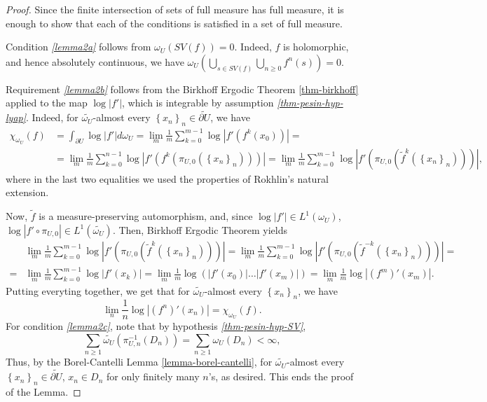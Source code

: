 \documentclass[11pt]{article}
\theoremstyle{definition}
\theoremstyle{remark}
\theoremstyle{plain}
\begin{document}
\begin{proof} Since the finite intersection of sets of full measure has full measure, it is enough to show that each of the conditions is satisfied in a set of full measure.
	
Condition {\em\ref{lemma2a}} follows from $ \omega_U(SV(f))=0$. Indeed, $ f $ is holomorphic, and hence absolutely continuous, we have $\omega_U( \bigcup_{s\in SV(f)} \bigcup_{n\geq0}f^n(s)) =0 $.


Requirement {\em\ref{lemma2b}} follows from the Birkhoff Ergodic Theorem \ref{thm-birkhoff} applied to the map $ \log \left| f'\right| $, which is integrable by assumption {\em \ref{thm-pesin-hyp-lyap}}. Indeed, for $ \widetilde{\omega_U }$-almost every $ \left\lbrace x_n\right\rbrace  _n\in\widetilde{\partial U} $, we have
\begin{align*}
	\chi_{\omega_U} (f)&=\int_{\partial U} \log \left| f'\right| d\omega_U=\lim\limits_{m}\frac{1}{m}\sum_{k=0}^{m-1}\log \left| f'(f^k(x_0))\right|=
	\\
&=	\lim\limits_{m}\frac{1}{m}\sum_{k=0}^{n-1}\log \left| f'(f^k(\pi_{U, 0}(\left\lbrace x_n\right\rbrace _n)))\right| =\lim\limits_{m}\frac{1}{m}\sum_{k=0}^{m-1}\log \left| f'(\pi_{U, 0}(\widetilde{f}^k(\left\lbrace x_n\right\rbrace _n)))\right|,
\end{align*}  where in the last two equalities we used the properties of Rokhlin's natural extension.

Now, $ \widetilde{f} $ is a measure-preserving automorphism, and, since  $ \log\left| f'\right| \in L^1(\omega_U)  $, $ \log\left| f'\circ \pi_{U, 0}\right| \in L^1(\widetilde{\omega_U})  $. Then, Birkhoff Ergodic Theorem yields
\begin{align*}
&	\lim\limits_{m}\frac{1}{m}\sum_{k=0}^{m-1}\log \left| f'(\pi_{U, 0}(\widetilde{f}^k(\left\lbrace x_n\right\rbrace _n)))\right|= \lim\limits_{m}\frac{1}{m}\sum_{k=0}^{m-1}\log \left| f'(\pi_{U, 0}(\widetilde{f}^{-k}(\left\lbrace x_n\right\rbrace _n)))\right|= 
	\\
=	&\lim\limits_{m}\frac{1}{m}\sum_{k=0}^{m-1}\log \left| f'(x_k)\right|=\lim\limits_{m}\frac{1}{m}\log ( \left| f'(x_0)\right|\dots  \left| f'(x_m)\right|)=\lim\limits_{m}\frac{1}{m}\log \left| (f^m)'(x_m)\right|.
\end{align*}
 Putting everyting together, we get that for $ \widetilde{\omega_U} $-almost every $ \left\lbrace x_n\right\rbrace _n $, we have \[\lim\limits_{n}\dfrac{1}{n}\log \left| (f^n)'(x_n)\right| =\chi_{\omega_U}(f).\]
	For condition {\em\ref{lemma2c}}, note that
by hypothesis {\em\ref{thm-pesin-hyp-SV}},  \[\sum_{n\geq 1}\widetilde{\omega_U}(\pi_{U,n}^{-1}(D_n))=\sum_{n\geq 1}\omega_U(D_n)<\infty,\] 
	Thus, by the Borel-Cantelli Lemma \ref{lemma-borel-cantelli}, for $ \widetilde{\omega_U} $-almost every $ \left\lbrace x_n\right\rbrace _n\in\widetilde{\partial U} $, $ x_n\in D_n $ for only finitely many $ n $'s, as desired. 
	This ends the proof of the Lemma.
\end{proof}
\end{document}
